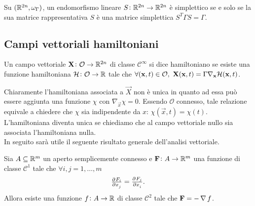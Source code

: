 \begin{proposition}
    Su $ (\mathbb{R}^{2n}, \omega_\Gamma) $, un endomorfismo lineare $ S \colon \mathbb{R}^{2n} \to \mathbb{R}^{2n} $ è simplettico se e solo se la sua matrice rappresentativa $ S $ è una matrice simplettica $ S^T \Gamma S = \Gamma $.
\end{proposition}

\subsection{Campi vettoriali hamiltoniani}

\begin{definition}
    Un campo vettoriale $ \mathbf{X} \colon \mathcal{O} \to \mathbb{R}^{2n} $ di classe $ \mathcal{C}^\infty $ si dice hamiltoniano se esiste una funzione hamiltoniana $ \mathcal{H} \colon \mathcal{O} \to \mathbb{R} $ tale che $ \forall (\vec{x}, t) \in \mathcal{O}, \ \vec{X}(\vec{x}, t) = \Gamma \nabla_\vec{x} \ham(\vec{x}, t) $.
\end{definition}

Chiaramente l'hamiltoniana associata a $ \vec{X} $ non è unica in quanto ad essa può essere aggiunta una funzione $ \chi $ con $ \nabla_\vec{x} \chi = 0 $. Essendo $ \mathcal{O} $ connesso, tale relazione equivale a chiedere che $ \chi $ sia indipendente da $ x $: $ \chi(\vec{x}, t) = \chi(t) $. L'hamiltoniana diventa unica se chiediamo che al campo vettoriale nullo sia associata l'hamiltoniana nulla. \\

In seguito sarà utile il seguente risultato generale dell'analisi vettoriale.

\begin{lemma}[Poincaré] \label{lem:poincare}
    Sia $ A \subseteq \mathbb{R}^m $ un aperto semplicemente connesso e $ \mathbf{F} \colon A \to \mathbb{R}^m $ una funzione di classe $ \mathcal{C}^1 $ tale che $ \forall i, j = 1, \ldots, m $
    \[
        \pd{F_i}{x_j} = \pd{F_j}{x_i}.
    \]
    Allora esiste una funzione $ f \colon A \to \mathbb{R} $ di classe $ \mathcal{C}^2 $ tale che $ \mathbf{F} = - \operatorname{\nabla}{f} $.
\end{lemma}

